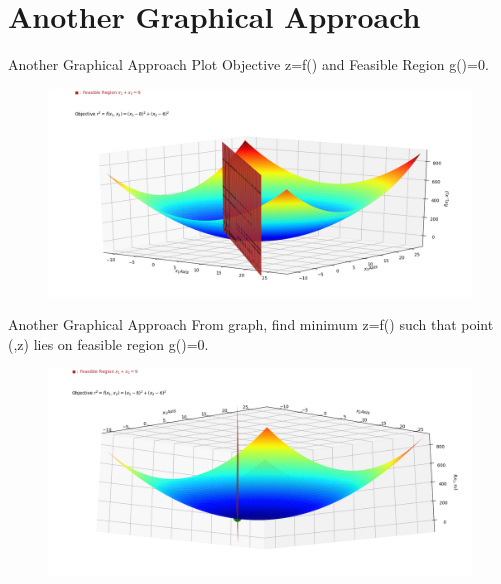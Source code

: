 \documentclass[10pt]{beamer}
\begin{document}
\section{Another Graphical Approach}

\begin{frame}{Another Graphical Approach}
Plot Objective z=f() and Feasible Region g()=0.
  \begin{figure}[h]
  \graphicspath{ {./images/} }
\includegraphics[scale = 0.34]{Figure_1.png}
\end{figure}   
\end{frame}

\begin{frame}{Another Graphical Approach}
From graph, find minimum z=f() such that point (,z) lies on feasible region g()=0.
     \begin{figure}[h]
     \graphicspath{ {./images/} }
\includegraphics[scale = 0.34]{Figure_2.png}
\end{figure}
\end{frame}
\end{document}
